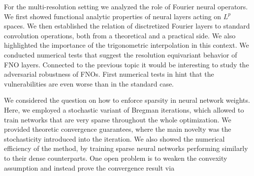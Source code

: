 For the multi-resolution setting we analyzed the role of Fourier neural operators. We first showed functional analytic properties of neural layers acting on $L^p$ spaces. We then established the relation of disctretized Fourier layers to standard convolution operations, both from a theoretical and a practical side. We also highlighted the importance of the trigonometric interpolation in this context. We conducted numerical tests that suggest the resolution equivariant behavior of FNO layers. Connected to the previous topic it would be interesting to study the adversarial robustness of FNOs. First numerical tests in \cite{kabri2022FNO} hint that the vulnerabilities are even worse than in the standard case.

We considered the question on how to enforce sparsity in neural network weights. Here, we employed a stochastic variant of Bregman iterations, which allowed to train networks that are very sparse throughout the whole optimization. We provided theoretic convergence guarantees, where the main novelty was the stochasticity introduced into the iteration. We also showed the numerical efficiency of the method, by training sparse neural networks performing similarly to their dense counterparts. One open problem is to weaken the convexity assumption and instead prove the convergence result via 
